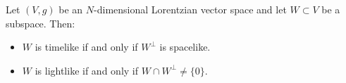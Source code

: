 Let $(V, g)$ be an $N$-dimensional Lorentzian vector space and let $W \subset V$ be a subspace. Then:
\begin{itemize}
  \item[(a)] $W$ is timelike if and only if $W^\perp$ is spacelike.
  \item[(b)] $W$ is lightlike if and only if $W \cap W^\perp \neq \{0\}$.
\end{itemize}
